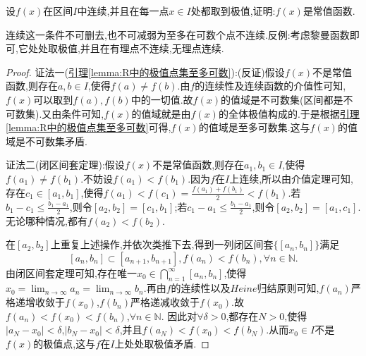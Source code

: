 \documentclass[../../main.tex]{subfiles}%
\begin{document}
\begin{example}
设\(f(x)\)在区间\(I\)中连续,并且在每一点\(x\in I\)处都取到极值,证明:\(f(x)\)是常值函数.
\end{example}
\begin{remark}
连续这一条件不可删去,也不可减弱为至多在可数个点不连续.反例:考虑黎曼函数即可,它处处取极值,并且在有理点不连续,无理点连续.
\end{remark}
\begin{proof}

{\color{blue}证法一(\hyperref[lemma:R中的极值点集至多可数]{引理\ref{lemma:R中的极值点集至多可数}}):}(反证)假设$f(x)$不是常值函数,则存在$a,b \in I$,使得$f(a)\ne f(b)$.由$f$的连续性及连续函数的介值性可知,$f(x)$可以取到$f(a),f(b)$中的一切值.故$f(x)$的值域是不可数集(区间都是不可数集).又由条件可知,$f(x)$的值域就是由$f(x)$的全体极值构成的.于是根据\hyperref[lemma:R中的极值点集至多可数]{引理\ref{lemma:R中的极值点集至多可数}}可得,$f(x)$的值域是至多可数集.这与$f(x)$的值域是不可数集矛盾.

{\color{blue}证法二(闭区间套定理):}假设$f(x)$不是常值函数,则存在$a_1,b_1 \in I$,使得$f(a_1)\ne f(b_1)$.不妨设$f(a_1)<f(b_1)$.因为\(f\)在\(I\)上连续,所以由介值定理可知,存在\(c_1\in [a_1,b_1]\),使得\(f(a_1) < f(c_1)=\frac{f(a_1) + f(b_1)}{2}<f(b_1)\).若\(b_1 - c_1\leqslant\frac{b_1 - a_1}{2}\),则令\([a_2,b_2]=[c_1,b_1]\);若\(c_1 - a_1\leqslant\frac{b_1 - a_1}{2}\),则令\([a_2,b_2]=[a_1,c_1]\).无论哪种情况,都有\(f(a_2) < f(b_2)\).

在\([a_2,b_2]\)上重复上述操作,并依次类推下去,得到一列闭区间套\(\{[a_n,b_n]\}\)满足
\[
[a_n,b_n]\subset [a_{n + 1},b_{n + 1}], f(a_n) < f(b_n),\forall n\in\mathbb{N}.
\]
由闭区间套定理可知,存在唯一\(x_0\in\bigcap_{n = 1}^{\infty}[a_n,b_n]\),使得\(x_0=\lim_{n\rightarrow\infty}a_n=\lim_{n\rightarrow\infty}b_n\).再由\(f\)的连续性以及\(Heine\)归结原则可知,\(f(a_n)\)严格递增收敛于\(f(x_0)\),\(f(b_n)\)严格递减收敛于\(f(x_0)\).故\(f(a_n) < f(x_0) < f(b_n)\),\(\forall n\in\mathbb{N}\).
因此对\(\forall\delta > 0\),都存在\(N > 0\),使得\(\vert a_N - x_0\vert<\delta\),\(\vert b_N - x_0\vert<\delta\),并且\(f(a_N) < f(x_0) < f(b_N)\).从而\(x_0\in I\)不是\(f(x)\)的极值点,这与\(f\)在\(I\)上处处取极值矛盾.
\end{proof}
\end{document}
